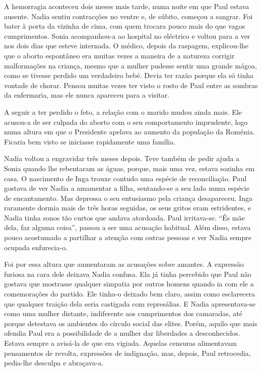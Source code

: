 A hemorragia aconteceu dois meses mais tarde, numa noite em que Paul
estava ausente. Nadia sentiu contracções no ventre e, de súbito,
começou a sangrar. Foi bater à porta da vizinha de cima, com quem
trocara pouco mais do que vagos cumprimentos. Sonia acompanhou-a ao
hospital no eléctrico e voltou para a ver nos dois dias que esteve
internada. O médico, depois da raspagem, explicou-lhe que o aborto
espontâneo era muitas vezes a maneira de a natureza corrigir
malformações na criança, mesmo que a mulher pudesse sentir uma grande
mágoa, como se tivesse perdido um verdadeiro bebé. Devia ter razão
porque ela só tinha vontade de chorar. Pensou muitas vezes ter visto o
rosto de Paul entre as sombras da enfermaria, mas ele nunca apareceu
para a visitar.

A seguir a ter perdido o feto, a relação com o marido
mudou ainda mais. Ele acusou-a de ser culpada do aborto com o seu
comportamento imprudente, logo numa altura em que o Presidente apelava
ao aumento da população
da Roménia. Ficaria bem visto se iniciasse rapidamente uma família.

Nadia voltou a engravidar três meses depois. Teve também de pedir
ajuda a Sonia quando lhe rebentaram as águas, porque, mais uma vez,
estava sozinha em casa. O nascimento de Inga trouxe contudo uma espécie
de reconciliação. Paul gostava de ver Nadia a amamentar a filha,
sentando-se a seu lado numa espécie de encantamento. Mas depressa o
seu entusiasmo pela criança desapareceu. Inga raramente dormia mais de
três horas seguidas, os seus gritos eram estridentes, e Nadia tinha
sonos tão curtos que andava atordoada. Paul irritava-se. ``És mãe dela,
faz alguma coisa'', passou a ser uma acusação habitual. Além disso,
estava pouco acostumado a partilhar a atenção com outras pessoas e ver
Nadia sempre ocupada enfurecia-o.

Foi por essa altura que aumentaram as acusações
sobre amantes. A expressão furiosa na cara dele deixava Nadia confusa.
Ela já tinha percebido que Paul não gostava que mostrasse qualquer
simpatia por outros homens quando ia com ele a comemorações do partido.
Ele tinha-o deixado bem claro, assim como esclarecera que qualquer
traição dela seria castigada com represálias. E Nadia apresentava-se
como uma mulher distante, indiferente aos cumprimentos dos camaradas,
até porque detestava os ambientes do círculo social das elites. Porém,
aquilo que mais ofendia Paul era a possibilidade de a mulher dar
liberdades a desconhecidos. Estava sempre a avisá-la de que era vigiada.
Aquelas censuras alimentavam pensamentos de revolta, expressões de
indignação, mas, depois, Paul retrocedia, pedia-lhe desculpa e abraçava-a.

